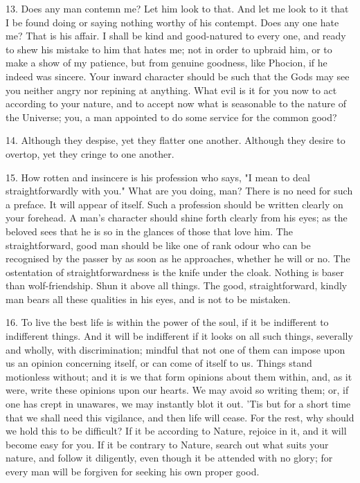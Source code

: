 \documentclass{book}
\begin{document}
13. Does any man contemn me? Let him look to that. And let me look to
it that I be found doing or saying nothing worthy of his
contempt. Does any one hate me? That is his affair. I shall be kind
and good-natured to every one, and ready to shew his mistake to him
that hates me; not in order to upbraid him, or to make a show of my
patience, but from genuine goodness, like Phocion, if he indeed was
sincere. Your inward character should be such that the Gods may see
you neither angry nor repining at anything. What evil is it for you
now to act according to your nature, and to accept now what is
seasonable to the nature of the Universe; you, a man appointed to do
some service for the common good?

14. Although they despise, yet they flatter one another. Although they
desire to overtop, yet they cringe to one another.

15. How rotten and insincere is his profession who says, "I mean to
deal straightforwardly with you." What are you doing, man? There is no
need for such a preface. It will appear of itself. Such a profession
should be written clearly on your forehead. A man's character should
shine forth clearly from his eyes; as the beloved sees that he is so
in the glances of those that love him. The straightforward, good man
should be like one of rank odour who can be recognised by the passer
by as soon as he approaches, whether he will or no. The ostentation of
straightforwardness is the knife under the cloak. Nothing is baser
than wolf-friendship. Shun it above all things. The good,
straightforward, kindly man bears all these qualities in his eyes, and
is not to be mistaken.

16. To live the best life is within the power of the soul, if it be
indifferent to indifferent things. And it will be indifferent if it
looks on all such things, severally and wholly, with discrimination;
mindful that not one of them can impose upon us an opinion concerning
itself, or can come of itself to us. Things stand motionless without;
and it is we that form opinions about them within, and, as it were,
write these opinions upon our hearts. We may avoid so writing them;
or, if one has crept in unawares, we may instantly blot it out. 'Tis
but for a short time that we shall need this vigilance, and then life
will cease. For the rest, why should we hold this to be difficult? If
it be according to Nature, rejoice in it, and it will become easy for
you. If it be contrary to Nature, search out what suits your nature,
and follow it diligently, even though it be attended with no glory;
for every man will be forgiven for seeking his own proper good.
\end{document}
